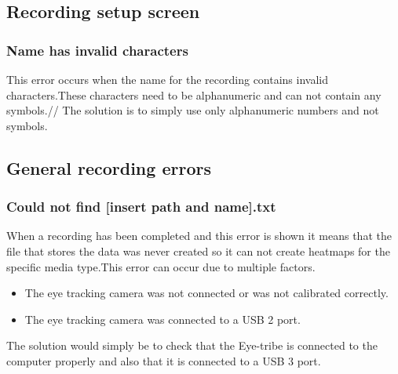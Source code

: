 \subsection{Recording setup screen}
\subsubsection{Name has invalid characters}
This error occurs when the name for the recording contains invalid characters.These characters need to be alphanumeric and can not contain any symbols.//
The solution is to simply use only alphanumeric numbers and not symbols.
\subsection{General recording errors}
\subsubsection{Could not find [insert path and name].txt}
When a recording has been completed and this error is shown it means that the file that stores the data was never created so it can not create heatmaps for the specific media type.This error can occur due to multiple factors.\\
\begin{itemize}
\item The eye tracking camera was not connected or was not calibrated correctly.
\item The eye tracking camera was connected to a USB 2 port.
\end{itemize}
The solution would simply be to check that the Eye-tribe is connected to the computer properly and also that it is connected to a USB 3 port.
